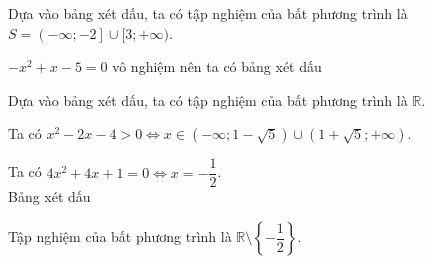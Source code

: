 \begin{vd}
{\begin{listEX}
\begin{center}
			\end{center}
			Dựa vào bảng xét dấu, ta có tập nghiệm của bất phương trình là $S=\left(-\infty;-2\right]\cup [3;+\infty)$.
			\item $-x^2+x-5=0$ vô nghiệm nên ta có bảng xét dấu
			\begin{center}
			\end{center}
			Dựa vào bảng xét dấu, ta có tập nghiệm của bất phương trình là $\mathbb{R}$.
			\item Ta có $x^2-2x-4>0\Leftrightarrow x\in\left(-\infty;1-\sqrt{5}\right)\cup \left(1+\sqrt{5};+\infty\right)$.
			\item Ta có $4x^2+4x+1=0\Leftrightarrow x=-\dfrac{1}{2} $.\\
			Bảng xét dấu
			\begin{center}
			\end{center}
			Tập nghiệm của bất phương trình là $\mathbb{R}\setminus\left\{-\dfrac{1}{2}\right\}$.
			
		\end{listEX}
	}
\end{vd}

